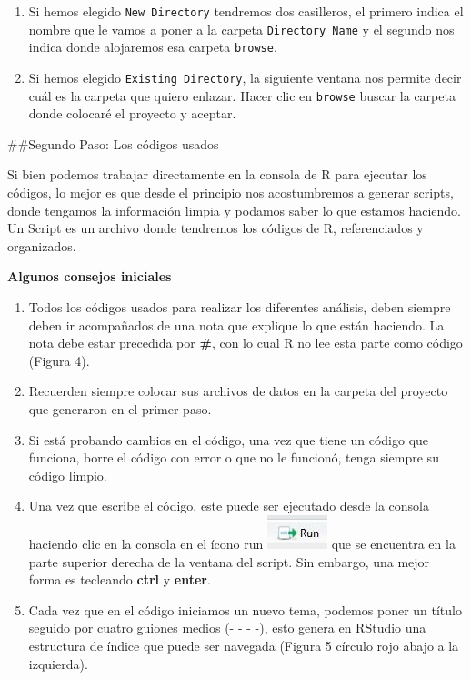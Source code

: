 \documentclass[
]{article}
\begin{document}
\begin{enumerate}
\def\labelenumi{\arabic{enumi}.}
\setcounter{enumi}{3}
\item
  Si hemos elegido \texttt{New\ Directory} tendremos dos casilleros, el
  primero indica el nombre que le vamos a poner a la carpeta
  \texttt{Directory\ Name} y el segundo nos indica donde alojaremos esa
  carpeta \texttt{browse}.
\item
  Si hemos elegido \texttt{Existing\ Directory}, la siguiente ventana
  nos permite decir cuál es la carpeta que quiero enlazar. Hacer clic en
  \texttt{browse} buscar la carpeta donde colocaré el proyecto y
  aceptar.
\end{enumerate}

\#\#Segundo Paso: Los códigos usados

Si bien podemos trabajar directamente en la consola de R para ejecutar
los códigos, lo mejor es que desde el principio nos acostumbremos a
generar scripts, donde tengamos la información limpia y podamos saber lo
que estamos haciendo. Un Script es un archivo donde tendremos los
códigos de R, referenciados y organizados.

\textbf{Algunos consejos iniciales}

\begin{enumerate}
\def\labelenumi{\alph{enumi}.}
\item
  Todos los códigos usados para realizar los diferentes análisis, deben
  siempre deben ir acompañados de una nota que explique lo que están
  haciendo. La nota debe estar precedida por \textbf{\#}, con lo cual R
  no lee esta parte como código (Figura 4).
\item
  Recuerden siempre colocar sus archivos de datos en la carpeta del
  proyecto que generaron en el primer paso.
\item
  Si está probando cambios en el código, una vez que tiene un código que
  funciona, borre el código con error o que no le funcionó, tenga
  siempre su código limpio.
\item
  Una vez que escribe el código, este puede ser ejecutado desde la
  consola haciendo clic en la consola en el ícono run
  \includegraphics{imagen/RStudio_Run.jpg} que se encuentra en la parte
  superior derecha de la ventana del script. Sin embargo, una mejor
  forma es tecleando \textbf{ctrl} y \textbf{enter}.
\item
  Cada vez que en el código iniciamos un nuevo tema, podemos poner un
  título seguido por cuatro guiones medios (- - - -), esto genera en
  RStudio una estructura de índice que puede ser navegada (Figura 5
  círculo rojo abajo a la izquierda).
\end{enumerate}
\end{document}
